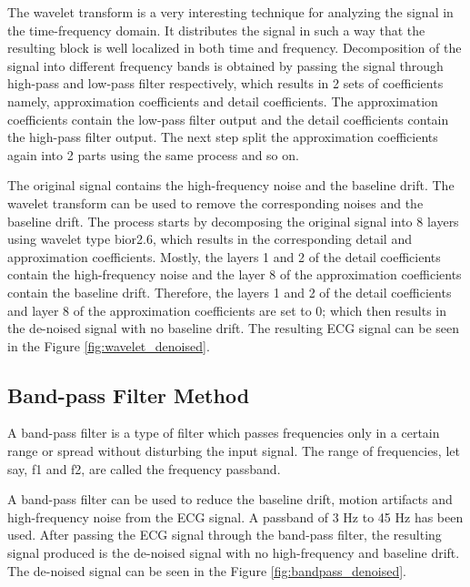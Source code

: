The wavelet transform is a very interesting technique for analyzing the signal in the time-frequency domain. It distributes the signal in such a way that the resulting block is well localized in both time and frequency. Decomposition of the signal into different frequency bands is obtained by passing the signal through high-pass and low-pass filter respectively, which results in 2 sets of coefficients namely, approximation coefficients and detail coefficients. The approximation coefficients contain the low-pass filter output and the detail coefficients contain the high-pass filter output. The next step split the approximation coefficients again into 2 parts using the same process and so on.

The original signal contains the high-frequency noise and the baseline drift. The wavelet transform can be used to remove the corresponding noises and the baseline drift. The process starts by decomposing the original signal into 8 layers using wavelet type bior2.6, which results in the corresponding detail and approximation coefficients. Mostly, the layers 1 and 2 of the detail coefficients contain the high-frequency noise and the layer 8 of the approximation coefficients contain the baseline drift. Therefore, the layers 1 and 2 of the detail coefficients and layer 8 of the approximation coefficients are set to 0; which then results in the de-noised signal with no baseline drift. The resulting ECG signal can be seen in the Figure \ref{fig:wavelet_denoised}. 




\subsection{Band-pass Filter Method}
A band-pass filter is a type of filter which passes frequencies only in a certain range or spread without disturbing the input signal. The range of frequencies, let say, f1 and f2, are called the frequency passband.

A band-pass filter can be used to reduce the baseline drift, motion artifacts and high-frequency noise from the ECG signal. A passband of 3 Hz to 45 Hz has been used. After passing the ECG signal through the band-pass filter, the resulting signal produced is the de-noised signal with no high-frequency and baseline drift. The de-noised signal can be seen in the Figure \ref{fig:bandpass_denoised}. 

